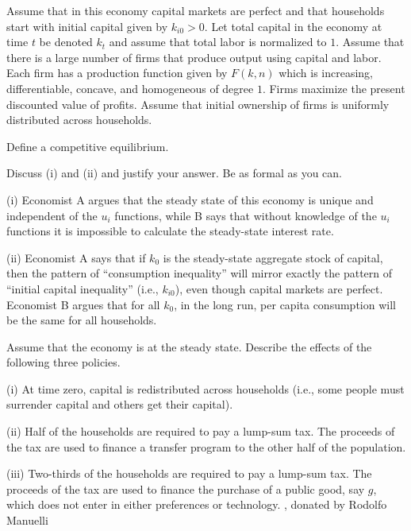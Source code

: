 \medskip
Assume that in this economy capital markets are perfect and that households start
with initial capital given by $k_{i0}>0$.  Let total capital in the economy at
time $t$ be denoted $k_t$ and assume that total labor is normalized to $1$.
\medskip
Assume that there is a large number of firms that produce output using capital
and labor.  Each firm has a production function given by $F(k,n)$ which is
increasing, differentiable, concave, and homogeneous of degree $1$.  Firms
maximize the present discounted value of profits.  Assume that initial
ownership of firms is uniformly distributed across households.
\medskip

 Define a competitive equilibrium.
\medskip

 Discuss (i) and (ii) and justify your answer.  Be as formal as you can.
\medskip
\item{(i)} Economist A argues that the steady state of this economy
is unique and independent of the $u_i$ functions, while B says that without
knowledge of the $u_i$ functions it is impossible to calculate the steady-state
interest rate.
\medskip
\item{(ii)}  Economist A says that if $k_0$ is the steady-state aggregate
stock of capital, then the pattern of ``consumption inequality'' will mirror
exactly the pattern of ``initial capital inequality'' (i.e., $k_{i0}$), even
though capital markets are perfect.  Economist B argues that for all $k_0$,
in the long run, per capita consumption will be the same for all households.
\medskip


\medskip

 Assume that the economy is at the steady state.  Describe the
effects of the following three policies.
\medskip

\item{(i)}   At time zero, capital is redistributed across households
(i.e., some people must surrender capital %
and others get their capital).
\medskip

\item{(ii)}  Half of the households are required to pay a lump-sum tax.
The proceeds of the tax are used to finance a transfer program to the other
half of the population.
\medskip

\item{(iii)} Two-thirds of the households are required to pay a lump-sum tax.
The proceeds of the tax are used to finance the purchase of a public good,
say $g$, which does not enter in either preferences or technology.
\medskip
{} ,
 donated by Rodolfo Manuelli

